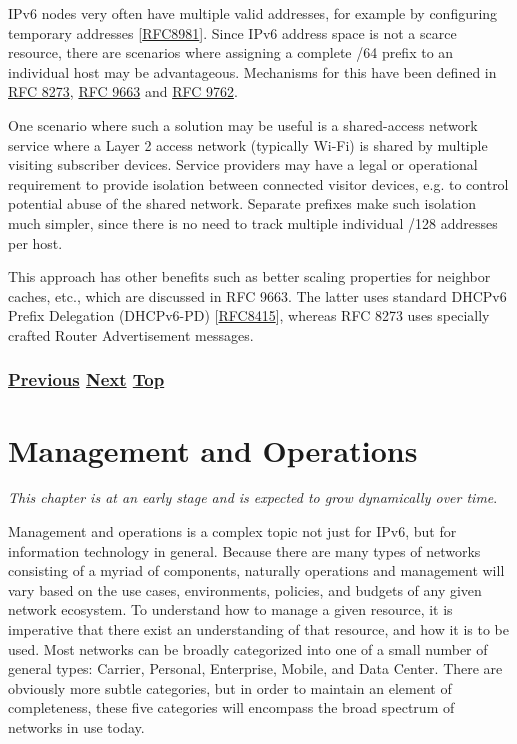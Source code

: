 \documentclass[
]{article}
\begin{document}
IPv6 nodes very often have multiple valid addresses, for example by
configuring temporary addresses
{[}\href{https://www.rfc-editor.org/info/rfc8981}{RFC8981}{]}. Since
IPv6 address space is not a scarce resource, there are scenarios where
assigning a complete /64 prefix to an individual host may be
advantageous. Mechanisms for this have been defined in
\href{https://www.rfc-editor.org/info/rfc8273}{RFC 8273},
\href{https://www.rfc-editor.org/info/rfc9663}{RFC 9663} and
\href{https://www.rfc-editor.org/info/rfc9762}{RFC 9762}.

One scenario where such a solution may be useful is a shared-access
network service where a Layer 2 access network (typically Wi-Fi) is
shared by multiple visiting subscriber devices. Service providers may
have a legal or operational requirement to provide isolation between
connected visitor devices, e.g. to control potential abuse of the shared
network. Separate prefixes make such isolation much simpler, since there
is no need to track multiple individual /128 addresses per host.

This approach has other benefits such as better scaling properties for
neighbor caches, etc., which are discussed in RFC 9663. The latter uses
standard DHCPv6 Prefix Delegation (DHCPv6-PD)
{[}\href{https://www.rfc-editor.org/info/rfc8415}{RFC8415}{]}, whereas
RFC 8273 uses specially crafted Router Advertisement messages.

\subsubsection{\texorpdfstring{\hyperref[address-planning]{Previous}
\hyperref[management-and-operations]{Next}
\hyperref[network-design]{Top}}{Previous Next Top}}\label{previous-next-top-25}

\pagebreak

\section{Management and Operations}\label{management-and-operations}

\emph{This chapter is at an early stage and is expected to grow
dynamically over time}.

Management and operations is a complex topic not just for IPv6, but for
information technology in general. Because there are many types of
networks consisting of a myriad of components, naturally operations and
management will vary based on the use cases, environments, policies, and
budgets of any given network ecosystem. To understand how to manage a
given resource, it is imperative that there exist an understanding of
that resource, and how it is to be used. Most networks can be broadly
categorized into one of a small number of general types: Carrier,
Personal, Enterprise, Mobile, and Data Center. There are obviously more
subtle categories, but in order to maintain an element of completeness,
these five categories will encompass the broad spectrum of networks in
use today.
\end{document}
